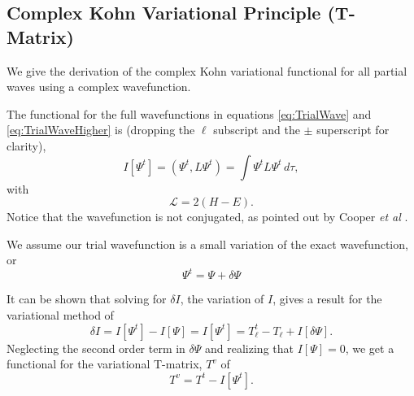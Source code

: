 \documentclass[preprint,showpacs,preprintnumbers,amsmath,amssymb]{revtex4}
\newcommand{\beq}{\begin{equation}}
\newcommand{\eeq}{\end{equation}}
\begin{document}
\subsection{Complex Kohn Variational Principle (T-Matrix)}
\label{sec:ComplexKohn}

We give the derivation of the complex Kohn variational functional for all partial waves using a complex wavefunction.

The functional for the full wavefunctions in equations \ref{eq:TrialWave} and \ref{eq:TrialWaveHigher} is (dropping the $\ell$ subscript and the $\pm$ superscript for clarity),
\begin{equation}
I[\Psi^t] = \left(\Psi^t, L \Psi^t \right) = \int \Psi^t L \Psi^t \,d\tau,
\label{eq:IlDefPsi}
\end{equation}
with
\beq
\mathcal{L} = 2(H - E).
\label{eq:LDef}
\eeq
Notice that the wavefunction is not conjugated, as pointed out by Cooper \emph{et al} \cite{Cooper2010}.

We assume our trial wavefunction is a small variation of the exact wavefunction, or
\beq
\Psi^t = \Psi + \delta \Psi
\label{eq:PsiTrialRelation}
\eeq

It can be shown that solving for $\delta I$, the variation of $I$, gives a result for the variational method of
\beq
\delta I = I[\Psi^t] - I[\Psi] = I[\Psi^t] = T_\ell^t - T_\ell + I[\delta \Psi].
\label{eq:IlPsiVariation}
\eeq
Neglecting the second order term in $\delta \Psi$ and realizing that $I[\Psi] = 0$, we get a functional for the variational T-matrix, $T^v$ of
\beq
T^v = T^t - I[\Psi^t].
\label{eq:ComplexKohnVariation}
\eeq
\end{document}
